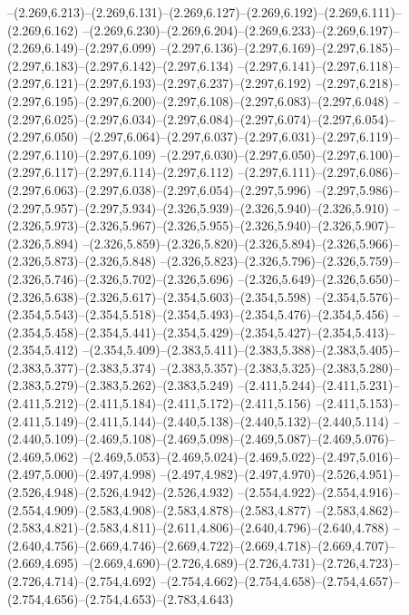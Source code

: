   --(2.269,6.213)--(2.269,6.131)--(2.269,6.127)--(2.269,6.192)--(2.269,6.111)--(2.269,6.162)%
  --(2.269,6.230)--(2.269,6.204)--(2.269,6.233)--(2.269,6.197)--(2.269,6.149)--(2.297,6.099)%
  --(2.297,6.136)--(2.297,6.169)--(2.297,6.185)--(2.297,6.183)--(2.297,6.142)--(2.297,6.134)%
  --(2.297,6.141)--(2.297,6.118)--(2.297,6.121)--(2.297,6.193)--(2.297,6.237)--(2.297,6.192)%
  --(2.297,6.218)--(2.297,6.195)--(2.297,6.200)--(2.297,6.108)--(2.297,6.083)--(2.297,6.048)%
  --(2.297,6.025)--(2.297,6.034)--(2.297,6.084)--(2.297,6.074)--(2.297,6.054)--(2.297,6.050)%
  --(2.297,6.064)--(2.297,6.037)--(2.297,6.031)--(2.297,6.119)--(2.297,6.110)--(2.297,6.109)%
  --(2.297,6.030)--(2.297,6.050)--(2.297,6.100)--(2.297,6.117)--(2.297,6.114)--(2.297,6.112)%
  --(2.297,6.111)--(2.297,6.086)--(2.297,6.063)--(2.297,6.038)--(2.297,6.054)--(2.297,5.996)%
  --(2.297,5.986)--(2.297,5.957)--(2.297,5.934)--(2.326,5.939)--(2.326,5.940)--(2.326,5.910)%
  --(2.326,5.973)--(2.326,5.967)--(2.326,5.955)--(2.326,5.940)--(2.326,5.907)--(2.326,5.894)%
  --(2.326,5.859)--(2.326,5.820)--(2.326,5.894)--(2.326,5.966)--(2.326,5.873)--(2.326,5.848)%
  --(2.326,5.823)--(2.326,5.796)--(2.326,5.759)--(2.326,5.746)--(2.326,5.702)--(2.326,5.696)%
  --(2.326,5.649)--(2.326,5.650)--(2.326,5.638)--(2.326,5.617)--(2.354,5.603)--(2.354,5.598)%
  --(2.354,5.576)--(2.354,5.543)--(2.354,5.518)--(2.354,5.493)--(2.354,5.476)--(2.354,5.456)%
  --(2.354,5.458)--(2.354,5.441)--(2.354,5.429)--(2.354,5.427)--(2.354,5.413)--(2.354,5.412)%
  --(2.354,5.409)--(2.383,5.411)--(2.383,5.388)--(2.383,5.405)--(2.383,5.377)--(2.383,5.374)%
  --(2.383,5.357)--(2.383,5.325)--(2.383,5.280)--(2.383,5.279)--(2.383,5.262)--(2.383,5.249)%
  --(2.411,5.244)--(2.411,5.231)--(2.411,5.212)--(2.411,5.184)--(2.411,5.172)--(2.411,5.156)%
  --(2.411,5.153)--(2.411,5.149)--(2.411,5.144)--(2.440,5.138)--(2.440,5.132)--(2.440,5.114)%
  --(2.440,5.109)--(2.469,5.108)--(2.469,5.098)--(2.469,5.087)--(2.469,5.076)--(2.469,5.062)%
  --(2.469,5.053)--(2.469,5.024)--(2.469,5.022)--(2.497,5.016)--(2.497,5.000)--(2.497,4.998)%
  --(2.497,4.982)--(2.497,4.970)--(2.526,4.951)--(2.526,4.948)--(2.526,4.942)--(2.526,4.932)%
  --(2.554,4.922)--(2.554,4.916)--(2.554,4.909)--(2.583,4.908)--(2.583,4.878)--(2.583,4.877)%
  --(2.583,4.862)--(2.583,4.821)--(2.583,4.811)--(2.611,4.806)--(2.640,4.796)--(2.640,4.788)%
  --(2.640,4.756)--(2.669,4.746)--(2.669,4.722)--(2.669,4.718)--(2.669,4.707)--(2.669,4.695)%
  --(2.669,4.690)--(2.726,4.689)--(2.726,4.731)--(2.726,4.723)--(2.726,4.714)--(2.754,4.692)%
  --(2.754,4.662)--(2.754,4.658)--(2.754,4.657)--(2.754,4.656)--(2.754,4.653)--(2.783,4.643)%
